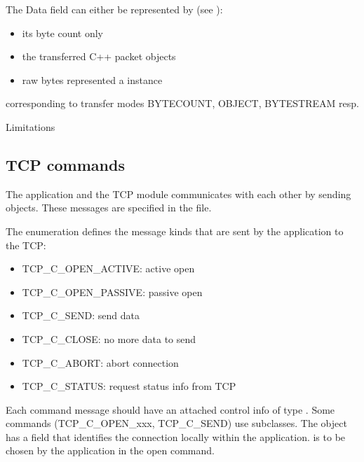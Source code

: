 The Data field can either be represented by (see ):
\begin{itemize}
  \item its byte count only
  \item the transferred C++ packet objects
  \item raw bytes represented a  instance
\end{itemize}

corresponding to transfer modes BYTECOUNT, OBJECT, BYTESTREAM resp.

Limitations


\subsection{TCP commands}

The application and the TCP module communicates with each other
by sending  objects. These messages are specified
in the  file.

The  enumeration defines the message kinds
that are sent by the application to the TCP:
\begin{itemize}
  \item TCP\_C\_OPEN\_ACTIVE: active open
  \item TCP\_C\_OPEN\_PASSIVE: passive open
  \item TCP\_C\_SEND: send data
  \item TCP\_C\_CLOSE: no more data to send
  \item TCP\_C\_ABORT: abort connection
  \item TCP\_C\_STATUS: request status info from TCP
\end{itemize}

Each command message should have an attached control info of type .
Some commands (TCP\_C\_OPEN\_xxx, TCP\_C\_SEND) use subclasses.
The  object has a  field that identifies the
connection locally within the application.  is to be chosen by the
application in the open command.

